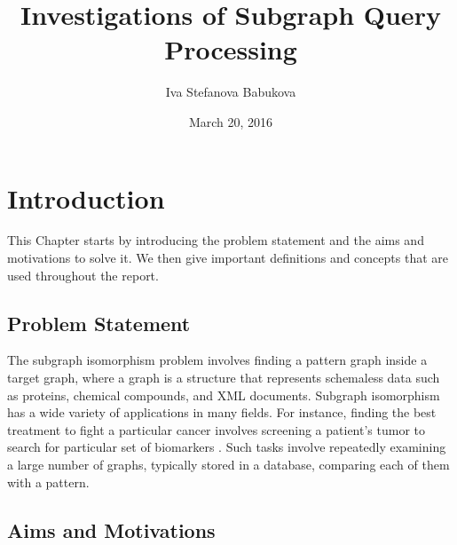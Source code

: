\documentclass{l4proj}
\begin{document}
\title{Investigations of Subgraph Query Processing}
\author{Iva Stefanova Babukova}
\date{March 20, 2016}
\maketitle

\begin{abstract}


\end{abstract}

\educationalconsent
%
%
\tableofcontents
\chapter{Introduction}
\label{ch:introduction}

This Chapter starts by introducing the problem statement and the aims and motivations to solve it. We then give important definitions and concepts that are used throughout the report. 

\section{Problem Statement}
The subgraph isomorphism problem involves finding a pattern graph inside a target graph, where a graph is a structure that represents schemaless data such as proteins, chemical compounds, and XML documents. Subgraph isomorphism has a wide variety of applications in many fields. For instance, finding the best treatment to fight a particular cancer involves screening a patient's tumor to search for particular set of biomarkers \cite{nature:2015}. Such tasks involve repeatedly examining a large number of graphs, typically stored in a database, comparing each of them with a pattern.


\section{Aims and Motivations}  
        
\end{document}
